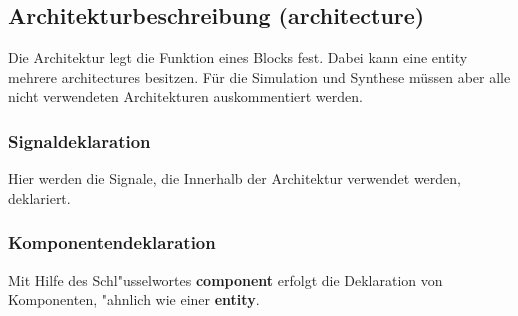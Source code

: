 \begin{multicols}{2}	
	\subsection{Architekturbeschreibung (architecture)}
	Die Architektur legt die Funktion eines Blocks fest. Dabei kann eine entity mehrere architectures besitzen. Für die Simulation und Synthese müssen aber alle nicht verwendeten Architekturen auskommentiert werden.
	
	\vfill\null
	\columnbreak

	\subsubsection{Signaldeklaration}
	 Hier werden die Signale, die Innerhalb der Architektur verwendet werden, deklariert.
	

	\subsubsection{Komponentendeklaration}
		Mit Hilfe des Schl"usselwortes \textbf{component} erfolgt die Deklaration von Komponenten, "ahnlich wie einer \textbf{entity}.\\
		
\end{multicols}

